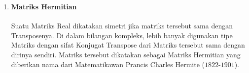 \documentclass[11pt,a4paper]{article}
\begin{document}
\begin{enumerate}
	
	\item \textbf{Matriks Hermitian}\\
	\\
	\hspace*{0.5cm} Suatu Matriks Real dikatakan simetri jika matriks tersebut sama dengan Transposenya. Di dalam bilangan kompleks, lebih banyak digunakan tipe Matriks dengan sifat Konjugat Transpose dari Matriks tersebut sama dengan dirinya sendiri. Matriks tersebut dikatakan sebagai Matriks Hermitian yang diberikan nama dari Matematikawan Prancis Charles Hermite ($1822$-$1901$).
	
	
	

		


\end{enumerate}
\end{document}
